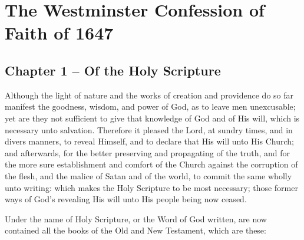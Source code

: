 \chapter{The Westminster Confession of Faith of 1647} 

\begin{outerlst}[left=0pt,labelsep=0pt]
\item
\section{Chapter 1 -- Of the Holy Scripture} 

\begin{innerlst}[wide, labelwidth=!, labelindent=0pt, labelsep=4pt]
\item Although the light of nature and the works of creation and providence do so far manifest the goodness, wisdom, and power of God, as to leave men unexcusable; yet are they not sufficient to give that knowledge of God and of His will, which is necessary unto salvation. Therefore it pleased the Lord, at sundry times, and in divers manners, to reveal Himself, and to declare that His will unto His Church; and afterwards, for the better preserving and propagating of the truth, and for the more sure establishment and comfort of the Church against the corruption of the flesh, and the malice of Satan and of the world, to commit the same wholly unto writing: which makes the Holy Scripture to be most necessary; those former ways of God's revealing His will unto His people being now ceased.   

\item Under the name of Holy Scripture, or the Word of God written, are now contained all the books of the Old and New Testament, which are these:


\end{innerlst}
\end{outerlst}
